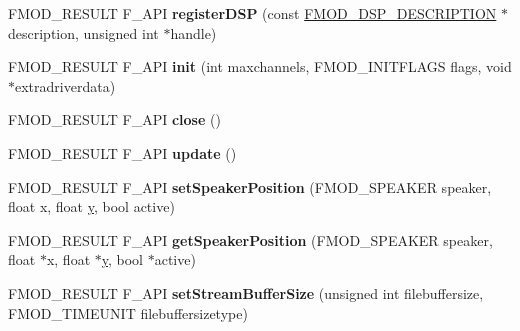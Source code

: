 \begin{DoxyCompactItemize}
\item 
\hypertarget{class_f_m_o_d_1_1_system_aafa782d22d2647a52acb59ff2d8b37ce}{F\+M\+O\+D\+\_\+\+R\+E\+S\+U\+L\+T F\+\_\+\+A\+P\+I {\bfseries register\+D\+S\+P} (const \hyperlink{struct_f_m_o_d___d_s_p___d_e_s_c_r_i_p_t_i_o_n}{F\+M\+O\+D\+\_\+\+D\+S\+P\+\_\+\+D\+E\+S\+C\+R\+I\+P\+T\+I\+O\+N} $\ast$description, unsigned int $\ast$handle)}\label{class_f_m_o_d_1_1_system_aafa782d22d2647a52acb59ff2d8b37ce}

\item 
\hypertarget{class_f_m_o_d_1_1_system_a0f8f7c5f25875362ff9d822ca894857a}{F\+M\+O\+D\+\_\+\+R\+E\+S\+U\+L\+T F\+\_\+\+A\+P\+I {\bfseries init} (int maxchannels, F\+M\+O\+D\+\_\+\+I\+N\+I\+T\+F\+L\+A\+G\+S flags, void $\ast$extradriverdata)}\label{class_f_m_o_d_1_1_system_a0f8f7c5f25875362ff9d822ca894857a}

\item 
\hypertarget{class_f_m_o_d_1_1_system_af8b6c4c677e44197657893de01383169}{F\+M\+O\+D\+\_\+\+R\+E\+S\+U\+L\+T F\+\_\+\+A\+P\+I {\bfseries close} ()}\label{class_f_m_o_d_1_1_system_af8b6c4c677e44197657893de01383169}

\item 
\hypertarget{class_f_m_o_d_1_1_system_a52538b2fe55918c1575ff22bbfab48d6}{F\+M\+O\+D\+\_\+\+R\+E\+S\+U\+L\+T F\+\_\+\+A\+P\+I {\bfseries update} ()}\label{class_f_m_o_d_1_1_system_a52538b2fe55918c1575ff22bbfab48d6}

\item 
\hypertarget{class_f_m_o_d_1_1_system_a0e814fbdc6a5a2aa2bbfbed56b461c53}{F\+M\+O\+D\+\_\+\+R\+E\+S\+U\+L\+T F\+\_\+\+A\+P\+I {\bfseries set\+Speaker\+Position} (F\+M\+O\+D\+\_\+\+S\+P\+E\+A\+K\+E\+R speaker, float x, float \hyperlink{_ice_utils_8h_aa7ffaed69623192258fb8679569ff9ba}{y}, bool active)}\label{class_f_m_o_d_1_1_system_a0e814fbdc6a5a2aa2bbfbed56b461c53}

\item 
\hypertarget{class_f_m_o_d_1_1_system_a931be005803ddbecb510eed93df39f10}{F\+M\+O\+D\+\_\+\+R\+E\+S\+U\+L\+T F\+\_\+\+A\+P\+I {\bfseries get\+Speaker\+Position} (F\+M\+O\+D\+\_\+\+S\+P\+E\+A\+K\+E\+R speaker, float $\ast$x, float $\ast$\hyperlink{_ice_utils_8h_aa7ffaed69623192258fb8679569ff9ba}{y}, bool $\ast$active)}\label{class_f_m_o_d_1_1_system_a931be005803ddbecb510eed93df39f10}

\item 
\hypertarget{class_f_m_o_d_1_1_system_a3a1af0fad360c049a38df4abcb14380c}{F\+M\+O\+D\+\_\+\+R\+E\+S\+U\+L\+T F\+\_\+\+A\+P\+I {\bfseries set\+Stream\+Buffer\+Size} (unsigned int filebuffersize, F\+M\+O\+D\+\_\+\+T\+I\+M\+E\+U\+N\+I\+T filebuffersizetype)}\label{class_f_m_o_d_1_1_system_a3a1af0fad360c049a38df4abcb14380c}


\end{DoxyCompactItemize}
